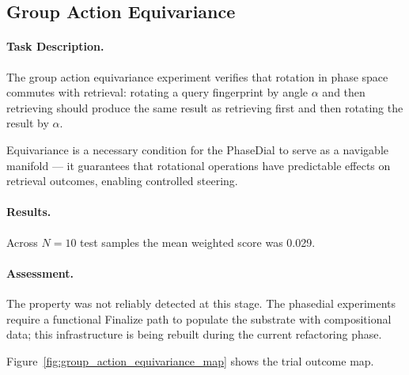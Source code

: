 \subsection{Group Action Equivariance}
\label{sec:group_action_equivariance}

\paragraph{Task Description.}
The group action equivariance experiment verifies that rotation in
phase space commutes with retrieval: rotating a query fingerprint by
angle $\alpha$ and then retrieving should produce the same result as
retrieving first and then rotating the result by $\alpha$.

Equivariance is a necessary condition for the PhaseDial to serve as a
navigable manifold --- it guarantees that rotational operations have
predictable effects on retrieval outcomes, enabling controlled steering.

\paragraph{Results.}
Across $N = 10$ test samples the mean weighted score was 0.029.

\paragraph{Assessment.}
The property was not reliably detected at this stage.  The phasedial
experiments require a functional Finalize path to populate the substrate
with compositional data; this infrastructure is being rebuilt during
the current refactoring phase.

Figure~\ref{fig:group_action_equivariance_map} shows the trial outcome map.
